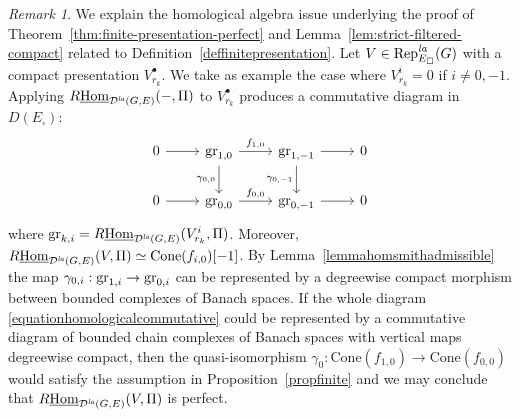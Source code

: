 \documentclass[a4paper,10pt]{amsart}
\theoremstyle{remark}
\newtheorem{remark}[theorem]{Remark}
\theoremstyle{definition}
\theoremstyle{plain}
\numberwithin{equation}{section}
\newcommand{\calD}{{\mathcal D}}
\newcommand{\gr}{{\rm gr}}
\newcommand{\Hom}{{\rm Hom}}
\newcommand{\la}{{\it la}}
\newcommand{\Rep}{{\rm Rep}}
\newcommand{\Cone}{\mathrm{Cone}}
\begin{document}
\begin{remark}
	We explain the homological algebra issue underlying the proof of Theorem~\ref{thm:finite-presentation-perfect} and Lemma~\ref{lem:strict-filtered-compact} related to Definition~\ref{deffinitepresentation}. Let $V\in \Rep^{\la}_{E_\square}(G)$ with a compact presentation $V_{r_k}^{\bullet}$. We take as example the case where $V_{r_k}^{i}=0$ if $i\neq 0,-1$. Applying $R\underline{\Hom}_{\calD^{\la}(G,E)}(-,\Pi)$ to $V_{r_k}^{\bullet}$ produces a commutative diagram in $D(E_{\square})$: 
\begin{equation}\label{equationhomologicalcommutative}
	\begin{tikzcd}
		0\ar[r] & \mathrm{gr}_{1,0} \ar[r,"f_{1,0}"] \ar[d, "\gamma_{0,0}"'] & \mathrm{gr}_{1,-1} \ar[r] \ar[d, "\gamma_{0,-1}"'] & 0  \\
		0 \ar[r] & \mathrm{gr}_{0,0}\ar[r,"f_{0,0}"] & \mathrm{gr}_{0,-1} \ar[r] & 0
		\end{tikzcd}
\end{equation}
where $\mathrm{gr}_{k,i}=R\underline{\Hom}_{\calD^{\la}(G,E)}(V_{r_k}^i,\Pi)$. Moreover, $R\underline{\Hom}_{\calD^{\la}(G,E)}(V,\Pi)\simeq \Cone(f_{i,0})[-1]$. By Lemma~\ref{lemmahomsmithadmissible} the map $\gamma_{0,i}:\gr_{1,i}\rightarrow \gr_{0,i}$ can be represented by a degreewise compact morphism between bounded complexes of Banach spaces. If the whole diagram \eqref{equationhomologicalcommutative} could be represented by a commutative diagram of bounded chain complexes of Banach spaces with vertical maps degreewise compact, then the quasi-isomorphism $\gamma_0: \Cone(f_{1,0})\rightarrow \Cone(f_{0,0})$ would satisfy the assumption in Proposition~\ref{propfinite} and we may conclude that $R\underline{\Hom}_{\calD^{\la}(G,E)}(V,\Pi)$ is perfect. 


\end{remark}
\end{document}
